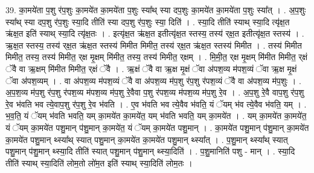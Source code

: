 \documentclass[17pt]{extarticle}
\begin{document}
39. का॒मये॑ता प॒शु र॑प॒शुः का॒मये॑त का॒मये॑ता प॒शुः स्या᳚थ् स्या दप॒शुः का॒मये॑त का॒मये॑ता प॒शुः स्या᳚त् । . अ॒प॒शुः स्या᳚थ् स्या दप॒शु र॑प॒शुः स्या॒दि तीति॑ स्या दप॒शु र॑प॒शुः स्या॒ दिति॑ । . स्या॒दि तीति॑ स्याथ् स्या॒दि त्यृ॑क्ष॒त ऋ॑क्ष॒त इति॑ स्याथ् स्या॒दि त्यृ॑क्ष॒तः । . इत्यृ॑क्ष॒त ऋ॑क्ष॒त इतीत्यृ॑क्ष॒त स्तस्य॒ तस्य॑ र्‌क्ष॒त इतीत्यृ॑क्ष॒त स्तस्य॑ । . ऋ॒क्ष॒त स्तस्य॒ तस्य॑ र्‌क्ष॒त ऋ॑क्ष॒त स्तस्य॑ मिमीत मिमीत॒ तस्य॑ र्‌क्ष॒त ऋ॑क्ष॒त स्तस्य॑ मिमीत । . तस्य॑ मिमीत मिमीत॒ तस्य॒ तस्य॑ मिमीत॒ र्‌क्ष मृ॒क्षम् मि॑मीत॒ तस्य॒ तस्य॑ मिमीत॒ र्‌क्षम् । . मि॒मी॒त॒ र्‌क्ष मृ॒क्षम् मि॑मीत मिमीत॒ र्‌क्षं ॅवै वा ऋ॒क्षम् मि॑मीत मिमीत॒ र्‌क्षं ॅवै । . ऋ॒क्षं ॅवै वा ऋ॒क्ष मृ॒क्षं ॅवा अ॑पश॒व्य म॑पश॒व्यं ॅवा ऋ॒क्ष मृ॒क्षं ॅवा अ॑पश॒व्यम् । . वा अ॑पश॒व्य म॑पश॒व्यं ॅवै वा अ॑पश॒व्य म॑प॒शु र॑प॒शु र॑पश॒व्यं ॅवै वा अ॑पश॒व्य म॑प॒शुः । . अ॒प॒श॒व्य म॑प॒शु र॑प॒शु र॑पश॒व्य म॑पश॒व्य म॑प॒शु रे॒वैवा प॒शु र॑पश॒व्य म॑पश॒व्य म॑प॒शु रे॒व । . अ॒प॒शु रे॒वै वाप॒शु र॑प॒शु रे॒व भ॑वति भव त्ये॒वाप॒शु र॑प॒शु रे॒व भ॑वति । . ए॒व भ॑वति भव त्ये॒वैव भ॑वति॒ यं ॅयम् भ॑व त्ये॒वैव भ॑वति॒ यम् । . भ॒व॒ति॒ यं ॅयम् भ॑वति भवति॒ यम् का॒मये॑त का॒मये॑त॒ यम् भ॑वति भवति॒ यम् का॒मये॑त । . यम् का॒मये॑त का॒मये॑त॒ यं ॅयम् का॒मये॑त पशु॒मान् प॑शु॒मान् का॒मये॑त॒ यं ॅयम् का॒मये॑त पशु॒मान् । . का॒मये॑त पशु॒मान् प॑शु॒मान् का॒मये॑त का॒मये॑त पशु॒मान् थ्स्या᳚थ् स्यात् पशु॒मान् का॒मये॑त का॒मये॑त पशु॒मान् थ्स्या᳚त् । . प॒शु॒मान् थ्स्या᳚थ् स्यात् पशु॒मान् प॑शु॒मान् थ्स्या॒दि तीति॑ स्यात् पशु॒मान् प॑शु॒मान् थ्स्या॒दिति॑ । . प॒शु॒मानिति॑ पशु - मान् । . स्या॒दि तीति॑ स्याथ् स्या॒दिति॑ लोम॒तो लो॑म॒त इति॑ स्याथ् स्या॒दिति॑ लोम॒तः । \newline
\pagebreak
{}
\end{document}
